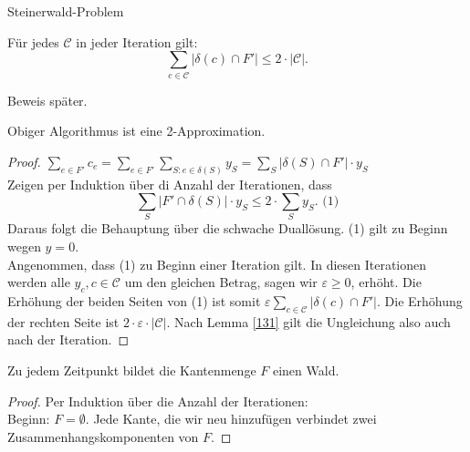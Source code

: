 \begin{section}{Steinerwald-Problem}
 \begin{lemma}[13.1]
 \label{131}
  Für jedes $\mathcal{C}$ in jeder Iteration gilt:
  \[\sum_{c\in\mathcal{C}} |\delta(c) \cap F'| \leq 2\cdot |\mathcal{C}|\text{.}\]
 \end{lemma}
 Beweis später.
 \begin{satz}[13.2]
  Obiger Algorithmus ist eine 2-Approximation.
 \end{satz}
 \begin{proof}
  $\sum_{e\in F'} c_e = \sum_{e\in F'} \sum_{S: e\in\delta(S)} y_S = \sum_S |\delta(S)\cap F'| \cdot y_S$\\
  Zeigen per Induktion über di Anzahl der Iterationen, dass 
  \[\sum_S |F'\cap \delta(S)| \cdot y_S \leq 2\cdot \sum_S y_S \text{.   (1)}\]
  Daraus folgt die Behauptung über die schwache Duallösung. (1) gilt zu Beginn wegen $y=0$.\\
  Angenommen, dass (1) zu Beginn einer Iteration gilt. In diesen Iterationen werden alle $y_c, c\in \mathcal{C}$ um den gleichen Betrag, sagen wir $\varepsilon \geq 0$, erhöht. Die Erhöhung der beiden Seiten von (1) ist somit $\varepsilon \sum_{c\in\mathcal{C}} |\delta(c) \cap F'|$. Die Erhöhung der rechten Seite ist $2\cdot \varepsilon \cdot |\mathcal{C}|$. Nach Lemma \ref{131} gilt die Ungleichung also auch nach der Iteration.
 \end{proof}
 
 \begin{proposition}[Beobachtung]
  Zu jedem Zeitpunkt bildet die Kantenmenge $F$ einen Wald.
 \end{proposition}
 \begin{proof}
  Per Induktion über die Anzahl der Iterationen:\\
  Beginn: $F = \emptyset$. Jede Kante, die wir neu hinzufügen verbindet zwei Zusammenhangskomponenten von $F$.
 \end{proof}
 

\end{section}

